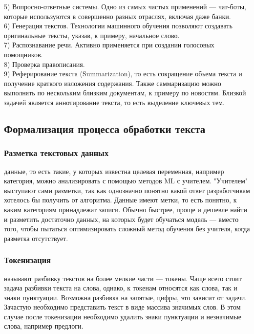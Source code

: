 \documentclass{article}
\newcommand\tab[1][1cm]{\hspace*{#1}}
\begin{document}
\tab5) Вопросно-ответные системы. Одно из самых частых применений — чат-боты, которые используются в совершенно разных отраслях, включая даже банки.\\
\tab6) Генерация текстов. Технологии машинного обучения позволяют создавать оригинальные тексты, указав, к примеру, начальное слово.\\
\tab7) Распознавание речи. Активно применяется при создании голосовых помощников.\\
\tab8) Проверка правописания.\\
\tab9) Реферирование текста (Summarization), то есть сокращение объема текста и получение краткого изложения содержания. Также саммаризацию можно выполнять по нескольким близким документам, к примеру по новостям. Близкой задачей является аннотирование текста, то есть выделение ключевых тем.
\subsection{Формализация процесса обработки текста} 
\subsubsection{Разметка текстовых данных} 
 данные, то есть такие, у которых известна целевая переменная, например категория, можно анализировать с помощью методов ML с учителем. "Учителем" выступают сами разметки, так как однозначно понятно какой ответ разработчикам хотелось бы получить от алгоритма. Данные имеют метки, то есть понятно, к каким категориям принадлежат записи. Обычно быстрее, проще и дешевле найти и разметить достаточно данных, на которых будет обучаться модель — вместо того, чтобы пытаться оптимизировать сложный метод обучения без учителя, когда разметка отсутствует. 
\subsubsection{Токенизация} 
 называют разбивку текстов на более мелкие части — токены. Чаще всего стоит задача разбивки текста на слова, однако, к токенам относятся как слова, так и знаки пунктуации. Возможна разбивка на запятые, цифры, это зависит от задачи. Зачастую необходимо представить текст в виде массива значимых слов. В этом случае после токенизации необходимо удалить знаки пунктуации и незначимые слова, например предлоги.
\end{document}
